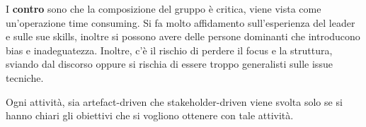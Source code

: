 \begin{itemize}
\begin{enumerate}
                        I \textbf{contro} sono che la composizione del gruppo è
                        critica, viene vista come un'operazione time consuming.
                        Si fa molto affidamento sull'esperienza del leader e
                        sulle sue skills, inoltre si possono avere delle persone
                        dominanti che introducono bias e inadeguatezza. Inoltre,
                        c'è il rischio di perdere il focus e la struttura, sviando
                        dal discorso oppure si rischia di essere troppo generalisti
                        sulle issue tecniche.
            \end{enumerate}
\end{itemize}
Ogni attività, sia artefact-driven che stakeholder-driven viene svolta solo se
si hanno chiari gli obiettivi che si vogliono ottenere con tale attività.
